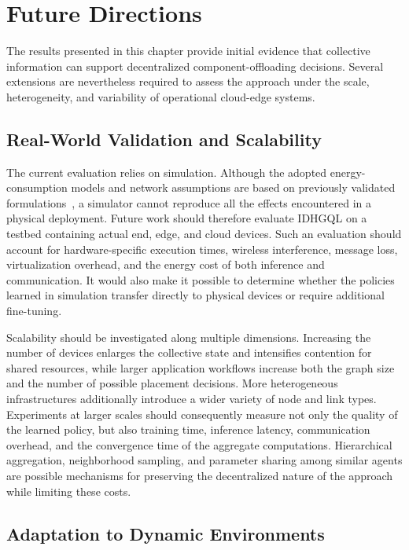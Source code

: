 \section{Future Directions}
\label{sec:ch09-future-directions}

The results presented in this chapter provide initial evidence that collective
information can support decentralized component-offloading decisions.
Several extensions are nevertheless required to assess the approach under the
scale, heterogeneity, and variability of operational cloud-edge systems.

\subsection{Real-World Validation and Scalability}

\sloppypar
The current evaluation relies on simulation.
Although the adopted energy-consumption models and network assumptions are based
on previously validated
formulations~\cite{Grochowski2006EnergyPI,DBLP:journals/fgcs/FarabegoliPCV24}, a simulator
cannot reproduce all the effects encountered in a physical deployment.
Future work should therefore evaluate IDHGQL on a testbed containing actual end,
edge, and cloud devices.
Such an evaluation should account for hardware-specific execution times, wireless
interference, message loss, virtualization overhead, and the energy cost of both
inference and communication.
It would also make it possible to determine whether the policies learned in
simulation transfer directly to physical devices or require additional
fine-tuning.

Scalability should be investigated along multiple dimensions.
Increasing the number of devices enlarges the collective state and intensifies
contention for shared resources, while larger application workflows increase both
the graph size and the number of possible placement decisions.
More heterogeneous infrastructures additionally introduce a wider variety of node
and link types.
Experiments at larger scales should consequently measure not only the quality of
the learned policy, but also training time, inference latency, communication
overhead, and the convergence time of the aggregate computations.
Hierarchical aggregation, neighborhood sampling, and parameter sharing among
similar agents are possible mechanisms for preserving the decentralized nature of
the approach while limiting these costs.

\subsection{Adaptation to Dynamic Environments}

